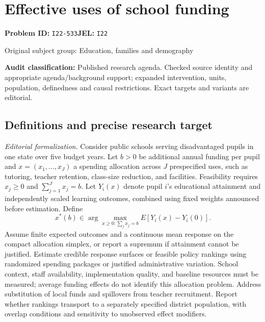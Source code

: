\documentclass[11pt,a4paper]{article}
\begin{document}
\section*{Effective uses of school funding}
\textbf{Problem ID:} \texttt{I22-533}\quad \textbf{JEL:} \texttt{I22}\par
\label{problem:OP-0452}
{\sffamily\small\color{muted}Original subject group: Education, families and demography\par}
\label{definitions:problem:30007734}
\textbf{Audit classification:} Published research agenda. Checked source identity and appropriate agenda/background support; expanded intervention, units, population, definedness and causal restrictions. Exact targets and variants are editorial.
\subsection*{Definitions and precise research target}
\textit{Editorial formalization.} Consider public schools serving disadvantaged pupils in one state over five budget years. Let \(b>0\) be additional annual funding per pupil and \(x=(x_1,\ldots,x_J)\) a spending allocation across \(J\) prespecified uses, such as tutoring, teacher retention, class-size reduction, and facilities. Feasibility requires \(x_j\geq0\) and \(\sum_{j=1}^{J}x_j=b\). Let \(Y_i(x)\) denote pupil \(i\)'s educational attainment and independently scaled learning outcomes, combined using fixed weights announced before estimation. Define
\[x^*(b)\in\arg\max_{x\geq0:\sum_jx_j=b}E[Y_i(x)-Y_i(0)].\]
Assume finite expected outcomes and a continuous mean response on the compact allocation simplex, or report a supremum if attainment cannot be justified. Estimate credible response surfaces or feasible policy rankings using randomized spending packages or justified administrative variation. School context, staff availability, implementation quality, and baseline resources must be measured; average funding effects do not identify this allocation problem. Address substitution of local funds and spillovers from teacher recruitment. Report whether rankings transport to a separately specified district population, with overlap conditions and sensitivity to unobserved effect modifiers.
\end{document}

